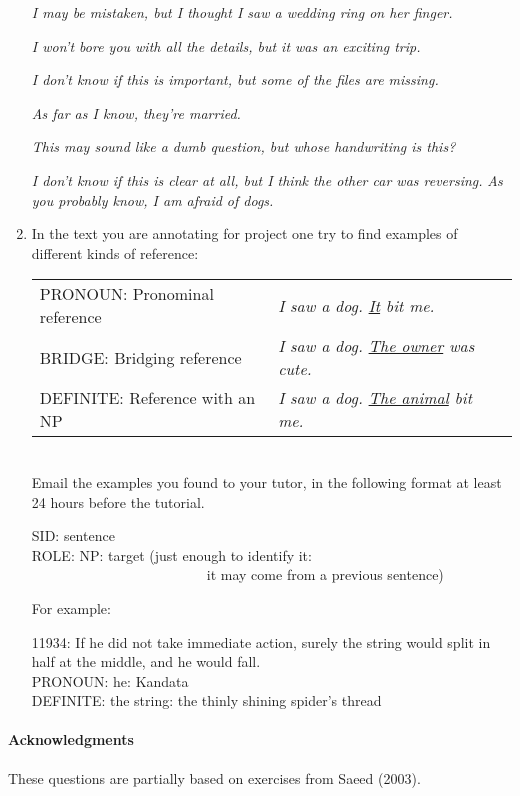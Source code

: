 \documentclass[a4paper]{article}
\newcommand{\ul}[1]{\uline{#1}}
\begin{document}
\begin{enumerate}
\begin{exe}
\ex \textit{I may be mistaken, but I thought I saw a wedding ring on her finger.}


\ex \textit{I won't bore you with all the details, but it was an exciting trip.}

\ex \textit{I don't know if this is important, but some of the files are missing.}

\ex \textit{As far as I know, they're married.}

\ex \textit{This may sound like a dumb question, but whose handwriting is this?}

\ex \textit{I don't know if this is clear at all, but I think the other car was reversing.}
\ex \textit{As you probably know, I am afraid of dogs.}
\end{exe}

\item In the text you are
  annotating for project one try to find  examples of different kinds of reference:\\[2ex]
  \begin{tabular}{lll}
    PRONOUN: Pronominal reference & \textit{I saw a dog. \ul{It} bit me.} \\
    BRIDGE:  Bridging reference & \textit{I saw a dog.  \ul{The owner} was cute.} \\
    DEFINITE: Reference with an NP & \textit{I saw a dog. \ul{The animal} bit me.} \\
  \end{tabular} \\[2ex]
  Email the examples you found to your tutor, 
  in the following format at least 24 hours before the tutorial.\\
   \begin{flushleft}
    SID: sentence \\
    ROLE: NP: target (just enough to identify it: \\
~~~~~~~~~~~~~~~~~~~~~~~~~it may come from a previous sentence)
  \end{flushleft}


\bigskip

   For example:
 
  \begin{flushleft}
    11934: If he did not take immediate action, surely the string would split in half at the middle, and he would fall.\\ 
    PRONOUN: he: Kandata \\
    DEFINITE: the string: the thinly shining spider's thread
  \end{flushleft}

\end{enumerate}
\vfill
\paragraph{Acknowledgments} These questions are partially
based on exercises from Saeed (2003).
\end{document}
